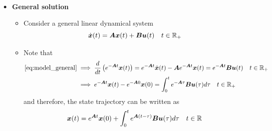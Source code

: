 \documentclass[12pt,a4paper]{article}
\begin{document}
\begin{itemize} 
\item \textbf{General solution}
  \begin{itemize}
  \item Consider a general linear dynamical system
    \begin{equation}\label{eq:model_general}%
      \dot{\bm{x}}(t) = \bm{A}\bm{x}(t) + \bm{B}\bm{u}(t)
      \quad t \in \R_{+}
    \end{equation}
  \item Note that
    \begin{align}
      \eqref{eq:model_general}
        & \implies \frac{d}{dt}\left(e^{-\bm{A}t}\bm{x}(t)\right) = e^{-\bm{A}t}\dot{\bm{x}}(t) - \bm{A}e^{-\bm{A}t}\bm{x}(t) = e^{-\bm{A}t}\bm{B}\bm{u}(t) \quad t \in \R_{+} \label{eq:integration} \\
        & \implies e^{-\bm{A}t}\bm{x}(t) - e^{-\bm{A}0}\bm{x}(0) = \int_{0}^{t}e^{-\bm{A}\tau}\bm{B}\bm{u}(\tau)d\tau \quad t \in \R_{+}
    \nonumber%
    \end{align}
    and therefore, the state trajectory can be written as
    \begin{equation}\label{eq:trajectory_general}%
      \bm{x}(t) = e^{\bm{A}t}\bm{x}(0) + \int_{0}^{t}e^{\bm{A}(t-\tau)}\bm{B}\bm{u}(\tau)d\tau
      \quad t \in \R
    \end{equation}
  \end{itemize}


\end{itemize}
\end{document}
